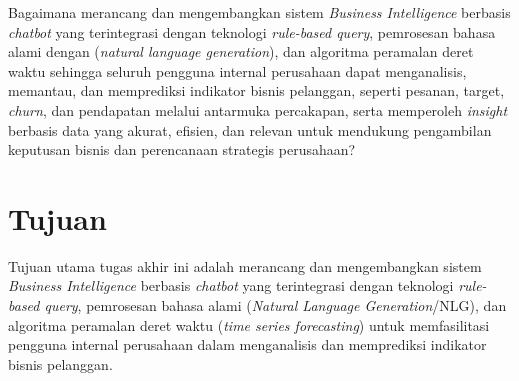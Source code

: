 Bagaimana merancang dan mengembangkan sistem \textit{Business Intelligence} berbasis \textit{chatbot} yang terintegrasi dengan teknologi \textit{rule-based query}, pemrosesan bahasa alami dengan (\textit{natural language generation}), dan algoritma peramalan deret waktu sehingga seluruh pengguna internal perusahaan dapat menganalisis, memantau, dan memprediksi indikator bisnis pelanggan, seperti pesanan, target, \textit{churn}, dan pendapatan melalui antarmuka percakapan, serta memperoleh \textit{insight} berbasis data yang akurat, efisien, dan relevan untuk mendukung pengambilan keputusan bisnis dan perencanaan strategis perusahaan?

\section{Tujuan}

Tujuan utama tugas akhir ini adalah merancang dan mengembangkan sistem \textit{Business Intelligence} berbasis \textit{chatbot} yang terintegrasi dengan teknologi \textit{rule-based query}, pemrosesan bahasa alami (\textit{Natural Language Generation}/NLG)\label{abbr:NLG}, dan algoritma peramalan deret waktu (\textit{time series forecasting}) untuk memfasilitasi pengguna internal perusahaan dalam menganalisis dan memprediksi indikator bisnis pelanggan.


